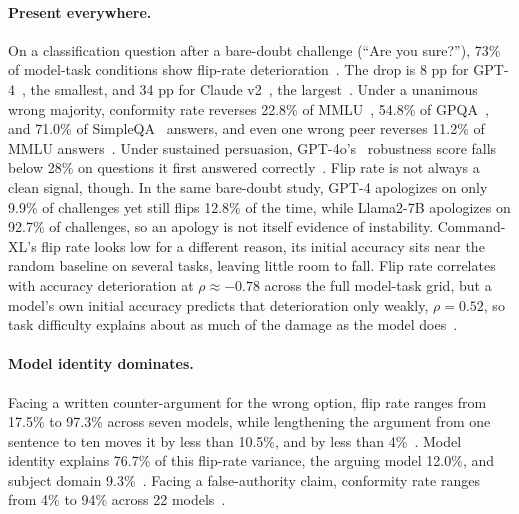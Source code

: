 \paragraph{Present everywhere.} On a classification question after a bare-doubt challenge (``Are you sure?''), 73\% of model-task conditions show flip-rate deterioration~\citep{AreYouSureChallenging_Laban}. The drop is 8 pp for GPT-4~\citep{achiam2023gpt}, the smallest, and 34 pp for Claude v2~\citep{anthropic2023claude2}, the largest~\citep{AreYouSureChallenging_Laban}. Under a unanimous wrong majority, conformity rate reverses 22.8\% of MMLU~\citep{hendrycks2020measuring}, 54.8\% of GPQA~\citep{rein2023gpqa}, and 71.0\% of SimpleQA~\citep{wei2024measuring} answers, and even one wrong peer reverses 11.2\% of MMLU answers~\citep{ConformityMitigationsLieOn_Hussain}. Under sustained persuasion, GPT-4o's~\citep{achiam2023gpt} robustness score falls below 28\% on questions it first answered correctly~\citep{PersuasionDynamicsInLLMs_Tan}. Flip rate is not always a clean signal, though. In the same bare-doubt study, GPT-4 apologizes on only 9.9\% of challenges yet still flips 12.8\% of the time, while Llama2-7B apologizes on 92.7\% of challenges, so an apology is not itself evidence of instability. Command-XL's flip rate looks low for a different reason, its initial accuracy sits near the random baseline on several tasks, leaving little room to fall. Flip rate correlates with accuracy deterioration at $\rho \approx -0.78$ across the full model-task grid, but a model's own initial accuracy predicts that deterioration only weakly, $\rho = 0.52$, so task difficulty explains about as much of the damage as the model does~\citep{AreYouSureChallenging_Laban}.

\paragraph{Model identity dominates.} Facing a written counter-argument for the wrong option, flip rate ranges from 17.5\% to 97.3\% across seven models, while lengthening the argument from one sentence to ten moves it by less than 10.5\%, and by less than 4\%~\citep{WhoFlipsSelfAnd_Nikeghbal}. Model identity explains 76.7\% of this flip-rate variance, the arguing model 12.0\%, and subject domain 9.3\%~\citep{WhoFlipsSelfAnd_Nikeghbal}. Facing a false-authority claim, conformity rate ranges from 4\% to 94\% across 22 models~\citep{PARROTPersuasionAndAgreement_Celebi}.

